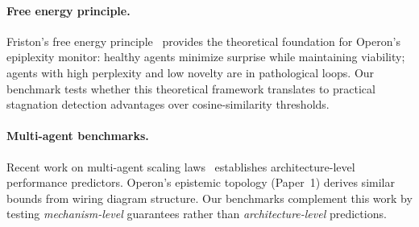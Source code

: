 \paragraph{Free energy principle.}
Friston's free energy principle~\cite{friston2010} provides the
theoretical foundation for Operon's epiplexity monitor: healthy agents
minimize surprise while maintaining viability; agents with high
perplexity and low novelty are in pathological loops.  Our benchmark
tests whether this theoretical framework translates to practical
stagnation detection advantages over cosine-similarity thresholds.

\paragraph{Multi-agent benchmarks.}
Recent work on multi-agent scaling laws~\cite{kim2025scaling} establishes
architecture-level performance predictors.  Operon's epistemic topology
(Paper~1) derives similar bounds from wiring diagram structure.  Our
benchmarks complement this work by testing \emph{mechanism-level}
guarantees rather than \emph{architecture-level} predictions.
